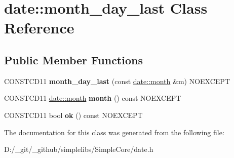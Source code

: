 \hypertarget{classdate_1_1month__day__last}{}\section{date\+::month\+\_\+day\+\_\+last Class Reference}
\label{classdate_1_1month__day__last}
\subsection*{Public Member Functions}
\begin{DoxyCompactItemize}
\item 
\mbox{\label{classdate_1_1month__day__last_a910f9cdf6d7d435b9b5ab0af49f32927}} 
C\+O\+N\+S\+T\+C\+D11 {\bfseries month\+\_\+day\+\_\+last} (const \mbox{\hyperlink{classdate_1_1month}{date\+::month}} \&m) N\+O\+E\+X\+C\+E\+PT
\item 
\mbox{\label{classdate_1_1month__day__last_a73c894574f497b329d684a23aab9484f}} 
C\+O\+N\+S\+T\+C\+D11 \mbox{\hyperlink{classdate_1_1month}{date\+::month}} {\bfseries month} () const N\+O\+E\+X\+C\+E\+PT
\item 
\mbox{\label{classdate_1_1month__day__last_a2d3d4b66a6832d9b86a6d30fef6cbf2a}} 
C\+O\+N\+S\+T\+C\+D11 bool {\bfseries ok} () const N\+O\+E\+X\+C\+E\+PT
\end{DoxyCompactItemize}


The documentation for this class was generated from the following file\+:\begin{DoxyCompactItemize}
\item 
D\+:/\+\_\+git/\+\_\+github/simplelibs/\+Simple\+Core/date.\+h\end{DoxyCompactItemize}
